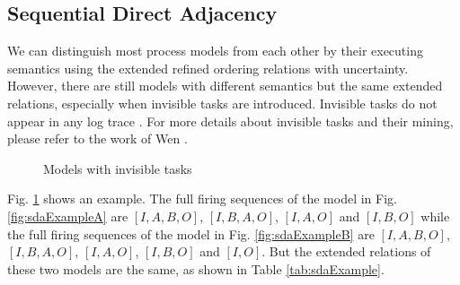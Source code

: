 \documentclass{llncs}
\begin{document}
\subsection{Sequential Direct Adjacency}\label{subsec:sda}
We can distinguish most process models from each other by their executing semantics using the extended refined ordering relations with uncertainty. However, there are still models with different semantics but the same extended relations, especially when invisible tasks are introduced. Invisible tasks do not appear in any log trace \cite{de2003workflow} . For more details about invisible tasks and their mining, please refer to the work of Wen \cite{wen2007mining}. 

\begin{figure}[h]
\centering
{}
\hspace{0.5cm}
\caption{Models with invisible tasks}
\label{fig:sdaExample}
\end{figure}

Fig. \ref{fig:sdaExample} shows an example. The full firing sequences of the model in Fig. \ref{fig:sdaExampleA} are $[I,A,B,O]$, $[I,B,A,O]$, $[I,A,O]$ and $[I,B,O]$ while the full firing sequences of the model in Fig. \ref{fig:sdaExampleB} are $[I,A,B,O]$, $[I,B,A,O]$, $[I,A,O]$, $[I,B,O]$ and $[I,O]$. But the extended relations of these two models are the same, as shown in Table \ref{tab:sdaExample}.
\end{document}
